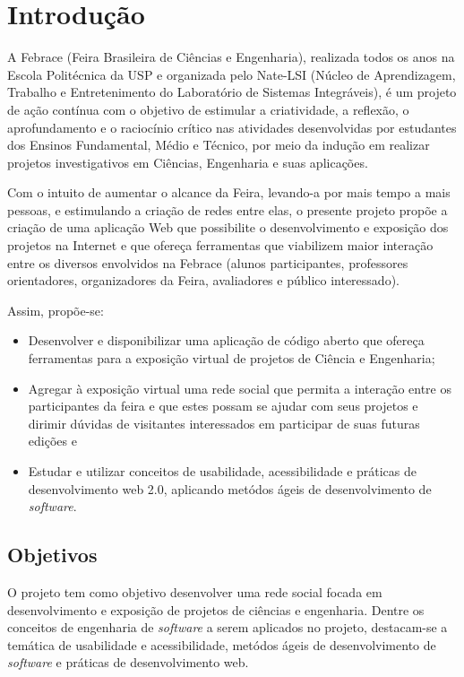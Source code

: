 \documentclass[a4paper,12pt,font=plain,header=plain]{abnt}
\begin{document}
	\chapter{Introdução}
	
	A Febrace (Feira Brasileira de Ciências e Engenharia), realizada todos os anos na Escola Politécnica da USP e organizada pelo Nate-LSI (Núcleo de Aprendizagem, Trabalho e Entretenimento do Laboratório de Sistemas Integráveis), é um projeto de ação contínua com o objetivo de estimular a criatividade, a reflexão, o aprofundamento e o raciocínio crítico nas atividades desenvolvidas por estudantes dos Ensinos Fundamental, Médio e Técnico, por meio da indução em realizar projetos investigativos em Ciências, Engenharia e suas aplicações.
	
	Com o intuito de aumentar o alcance da Feira, levando-a por mais tempo a mais pessoas, e estimulando a criação de redes entre elas, o presente projeto propõe a criação de uma aplicação Web que possibilite o desenvolvimento e exposição dos projetos na Internet e que ofereça ferramentas que viabilizem maior interação entre os diversos envolvidos na Febrace (alunos participantes, professores orientadores, organizadores da Feira, avaliadores e público interessado).
	
	Assim, propõe-se:
	
	\begin{itemize}
	\item{
		Desenvolver e disponibilizar uma aplicação de código aberto que ofereça ferramentas para a exposição virtual de projetos de Ciência e Engenharia;
	}
	\item{
		Agregar à exposição virtual uma rede social que permita a interação entre os participantes da feira e que estes possam se ajudar com seus projetos e dirimir dúvidas de visitantes interessados em participar de suas futuras edições e
	}
	\item{
		Estudar e utilizar conceitos de usabilidade, acessibilidade e práticas de desenvolvimento web 2.0, aplicando metódos ágeis de desenvolvimento de \textit{software}.
	}
	\end{itemize}

	\section{Objetivos}
	O projeto tem como objetivo desenvolver uma rede social focada em desenvolvimento e exposição de projetos de ciências e engenharia. Dentre os conceitos de engenharia de \textit{software} a serem aplicados no projeto, destacam-se a temática de usabilidade e acessibilidade, metódos ágeis de desenvolvimento de \textit{software} e práticas de desenvolvimento web.
\end{document}
